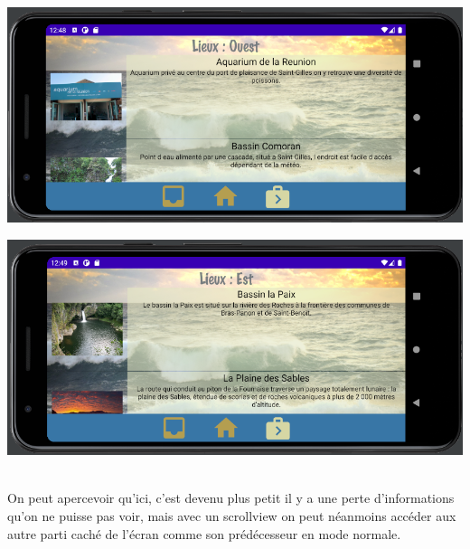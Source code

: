 \documentclass{article}
\begin{document}
\begin{minipage}{0.45\textwidth}
\includegraphics[width=\textwidth]{Lieux_ouest_p}
\end{minipage}
\hfill
\begin{minipage}{0.45\textwidth}
\includegraphics[width=\textwidth]{Lieux_est_p}
\end{minipage}
\\
On peut apercevoir qu'ici, c'est devenu plus petit il y a une perte d'informations qu'on ne puisse pas voir, mais avec un scrollview on peut néanmoins accéder aux autre parti caché de l'écran comme son prédécesseur en mode normale. 
\end{document}

